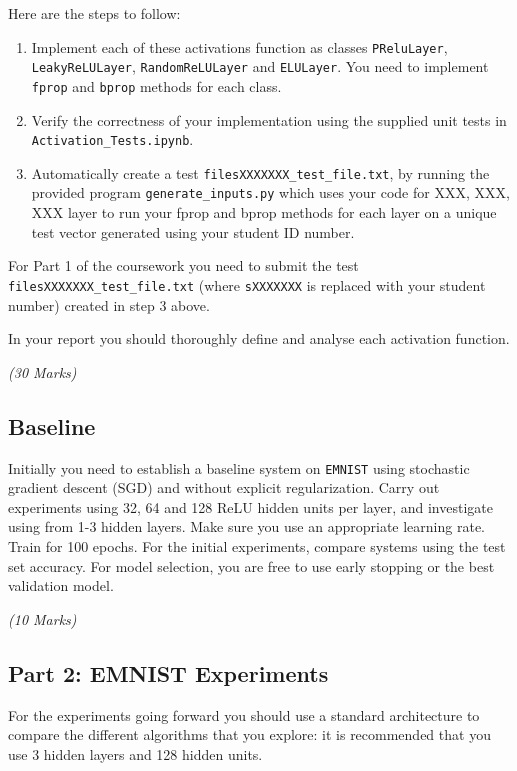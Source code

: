 \documentclass[11pt,]{article}
\begin{document}
Here are the steps to follow:
\begin{enumerate}
    \item Implement each of these activations function as classes \texttt{PReluLayer}, \texttt{LeakyReLULayer}, \texttt{RandomReLULayer} and \texttt{ELULayer}. You need to implement \texttt{fprop} and \texttt{bprop} methods for each class.
    
    \item Verify the correctness of your implementation using the supplied unit tests in \texttt{Activation\_Tests.ipynb}.
    
    \item Automatically  create  a  test  \texttt{filesXXXXXXX\_test\_file.txt},   by  running  the  provided  program \texttt{generate\_inputs.py} which uses your code for XXX, XXX, XXX layer to run your fprop and bprop methods for each layer on a unique test vector generated using your student ID number.
    
\end{enumerate}

For Part 1 of the coursework you need to submit the test \texttt{filesXXXXXXX\_test\_file.txt} (where \texttt{sXXXXXXX} is replaced with your student number) created in step 3 above.

In your report you should thoroughly define and analyse each activation function.

\emph{(30 Marks)}

\subsection{Baseline}
\label{sec:baseline}
Initially you need to establish a baseline system on \texttt{EMNIST} using stochastic gradient descent (SGD) and without explicit regularization.  Carry out experiments using 32, 64 and 128 ReLU hidden units per layer, and investigate using from 1-3 hidden layers.  Make sure you  use an appropriate learning rate. Train for 100 epochs. For the initial experiments, compare systems using the test set accuracy. For model selection, you are free to use early stopping or the best validation model. 

\emph{(10 Marks)}

\subsection{Part 2: EMNIST Experiments}
\label{sec:part2}
For the experiments going forward you should use a standard architecture to compare the different algorithms that you explore: it is recommended that you use 3 hidden layers and 128 hidden units.
\end{document}
